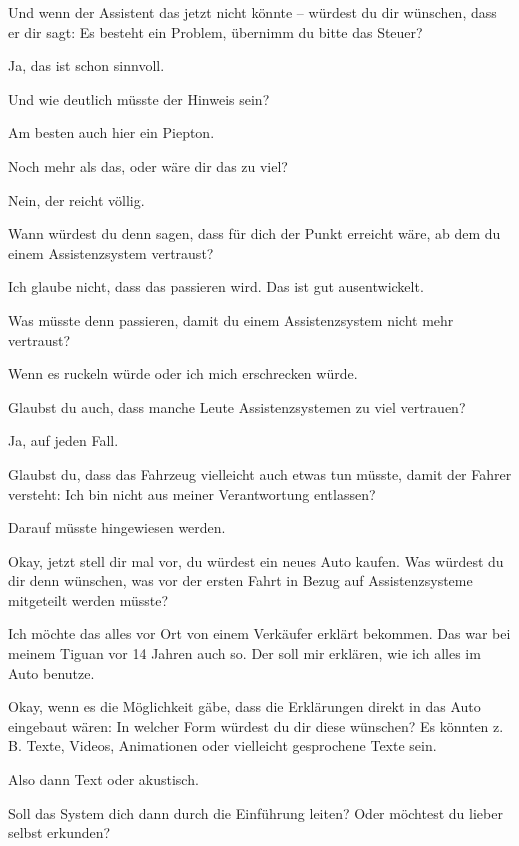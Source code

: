 \interviewerin
Und wenn der Assistent das jetzt nicht könnte – würdest du dir
wünschen, dass er dir sagt: Es besteht ein Problem, übernimm du bitte
das Steuer?

Ja, das ist schon sinnvoll.

\interviewerin
Und wie deutlich müsste der Hinweis sein?

Am besten auch hier ein Piepton.

\interviewerin
Noch mehr als das, oder wäre dir das zu viel?

Nein, der reicht völlig.

\interviewerin
Wann würdest du denn sagen, dass für dich der Punkt erreicht wäre, ab
dem du einem Assistenzsystem vertraust?

Ich glaube nicht, dass das passieren wird. Das ist gut ausentwickelt.

\interviewerin
Was müsste denn passieren, damit du einem Assistenzsystem nicht mehr
vertraust?

Wenn es ruckeln würde oder ich mich erschrecken würde.

\interviewerin
Glaubst du auch, dass manche Leute Assistenzsystemen zu viel vertrauen?

Ja, auf jeden Fall.

\interviewerin
Glaubst du, dass das Fahrzeug vielleicht auch etwas tun müsste, damit
der Fahrer versteht: Ich bin nicht aus meiner Verantwortung entlassen?

Darauf müsste hingewiesen werden.

\interviewerin
Okay, jetzt stell dir mal vor, du würdest ein neues Auto kaufen. Was
würdest du dir denn wünschen, was vor der ersten Fahrt in Bezug auf
Assistenzsysteme mitgeteilt werden müsste?

Ich möchte das alles vor Ort von einem Verkäufer erklärt bekommen. Das
war bei meinem Tiguan vor 14 Jahren auch so. Der soll mir erklären,
wie ich alles im Auto benutze.

\interviewerin
Okay, wenn es die Möglichkeit gäbe, dass die Erklärungen direkt in das
Auto eingebaut wären: In welcher Form würdest du dir diese wünschen?
Es könnten z. B. Texte, Videos, Animationen oder vielleicht gesprochene
Texte sein.

Also dann Text oder akustisch.

\interviewerin
Soll das System dich dann durch die Einführung leiten? Oder möchtest du
lieber selbst erkunden?

